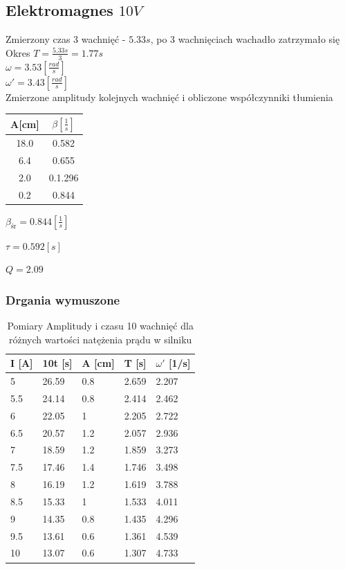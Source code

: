\documentclass[]{article}
\begin{document}
	\subsection{Elektromagnes $10V$}
	Zmierzony czas 3 wachnięć - $5.33s$, po 3 wachnięciach wachadło zatrzymało się\\
	Okres $T=\frac{5.33s}{3} = 1.77s$\\
	$\omega = 3.53 \left[ \frac{rad}{s}\right]$\\
	$\omega' = 3.43 \left[ \frac{rad}{s}\right]$\\
	Zmierzone amplitudy kolejnych wachnięć i obliczone współczynniki tłumienia
	\begin{table}[h]
		\begin{tabular}{|c|c|}
			\hline 
			A[cm] & $\beta\left[ \frac{1}{s}\right] $ \\ 
			\hline 
			18.0 & 0.582 \\ 
			\hline 
			6.4 & 0.655 \\ 
			\hline 
			2.0 & 0.1.296 \\ 
			\hline 
			0.2 & 0.844 \\ 
			\hline 
		\end{tabular} 
	\end{table}
	
	$\beta_{\text{śr}} = 0.844 \left[ \frac{1}{s}\right] $
	
	$\tau=0.592[s]$
	
	$Q = 2.09$
	
	\subsubsection{Drgania wymuszone}
	
	\begin{table}[h]
		\centering
		\caption{Pomiary Amplitudy i czasu 10 wachnięć dla różnych wartości natężenia prądu w silniku}
		\begin{tabular}{|l|l|l|l|l|}
			\hline
			
			I [A] & 10t [s] & A [cm] & T [s] & $\omega'$ [1/s] \\ \hline
			5 & 26.59 & 0.8 & 2.659 & 2.207 \\ \hline
			5.5 & 24.14 & 0.8 & 2.414 & 2.462 \\ \hline
			6 & 22.05 & 1 & 2.205 & 2.722 \\ \hline
			6.5 & 20.57 & 1.2 & 2.057 & 2.936 \\ \hline
			7 & 18.59 & 1.2 & 1.859 & 3.273 \\ \hline
			7.5 & 17.46 & 1.4 & 1.746 & 3.498 \\ \hline
			8 & 16.19 & 1.2 & 1.619 & 3.788 \\ \hline
			8.5 & 15.33 & 1 & 1.533 & 4.011 \\ \hline
			9 & 14.35 & 0.8 & 1.435 & 4.296 \\ \hline
			9.5 & 13.61 & 0.6 & 1.361 & 4.539 \\ \hline
			10 & 13.07 & 0.6 & 1.307 & 4.733 \\ \hline
			
			
		\end{tabular}
	\end{table}
	
\end{document}
